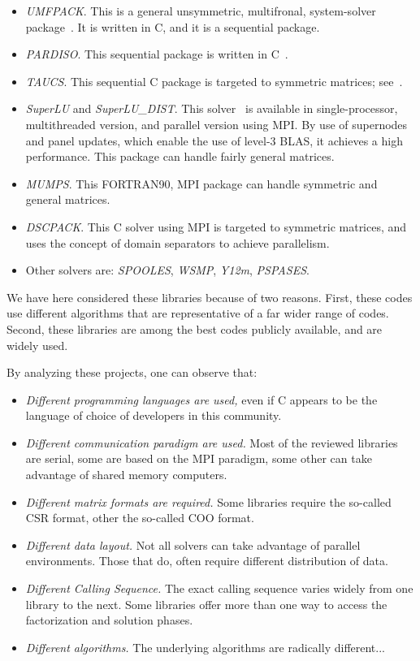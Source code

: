 \documentclass[acmtocl]{acmtrans2m}
\begin{document}
\begin{itemize}
\item
{\sl UMFPACK}. This is a general unsymmetric, multifronal, system-solver
package~\cite{umfpack-home-page}. It is written in C, and it is a sequential
package.
\item
{\sl PARDISO}. This sequential package is written in
C~\cite{oskl:04-etna,sg:04-fgcs}.
\item
{\sl TAUCS}. This sequential C package is targeted to symmetric matrices;
see~\cite{irony04parallel,rotkin04design,rozin04locality}.
\item 
{\sl SuperLU} and {\sl SuperLU\_DIST}. This solver~\cite{superlu-manual} is
available in single-processor, multithreaded version, and parallel version
using MPI. By use of supernodes and panel updates, which enable the use of
level-3 BLAS, it achieves a high performance. This package can handle fairly
general matrices.
\item
{\sl MUMPS}. This FORTRAN90, MPI package can handle symmetric and general
matrices.
\item
{\sl DSCPACK}. This C solver using MPI is targeted to symmetric matrices, and
uses the concept of domain separators to achieve parallelism.
\item
Other solvers are: {\sl SPOOLES}, {\sl WSMP}, {\sl Y12m}, {\sl PSPASES}.
\end{itemize}

We have here considered these libraries because of two reasons.
First, these codes use different algorithms that are
representative of a far wider range of codes. Second, these libraries are
among the best codes publicly available, and are widely used. 

By analyzing these projects, one can observe that:
\begin{itemize}
\item {\sl Different programming languages are used,}  even if C appears to be
  the language of choice of developers in this community.

\item {\sl Different communication paradigm are used.} 
 Most of the reviewed libraries are serial, some are based on the MPI
 paradigm, some other can take advantage of shared memory computers.

\item {\sl Different matrix formats are required.} Some libraries require the
so-called CSR format, other the so-called COO format. 

\item {\sl Different data layout.} Not all solvers can take advantage of
parallel environments. Those that do, often require different distribution of
data. 

\item {\sl Different Calling Sequence.} The exact calling sequence varies
widely from one library to the next.  Some libraries offer more than one way
to access the factorization and solution phases.

\item {\sl Different algorithms.} The underlying algorithms are radically
different...

\end{itemize}
\end{document}
